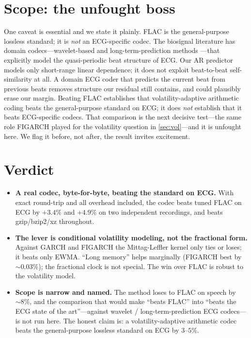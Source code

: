 \documentclass[11pt,reqno]{amsart}
\theoremstyle{plain}
\theoremstyle{remark}
\begin{document}
\section{Scope: the unfought boss}
\label{sec:scope}

One caveat is essential and we state it plainly. FLAC is the general-purpose
lossless standard; it is \emph{not} an ECG-specific codec. The biosignal
literature has domain codecs---wavelet-based and long-term-prediction methods
\cite{ecgcomp}---that explicitly model the quasi-periodic beat structure of ECG.
Our AR predictor models only short-range linear dependence; it does not exploit
beat-to-beat self-similarity at all. A domain ECG coder that predicts the
current beat from previous beats removes structure our residual still contains,
and could plausibly erase our margin. Beating FLAC establishes that
volatility-adaptive arithmetic coding beats the general-purpose standard on ECG;
it does \emph{not} establish that it beats ECG-specific codecs. That comparison
is the next decisive test---the same role FIGARCH played for the volatility
question in \cref{sec:vol}---and it is unfought here. We flag it before, not
after, the result invites excitement.

\section{Verdict}
\label{sec:verdict}

\begin{itemize}
\item \textbf{A real codec, byte-for-byte, beating the standard on ECG.} With
  exact round-trip and all overhead included, the codec beats tuned FLAC on ECG
  by $+3.4\%$ and $+4.9\%$ on two independent recordings, and beats gzip/bzip2/xz
  throughout.
\item \textbf{The lever is conditional volatility modeling, not the fractional
  form.} Against GARCH and FIGARCH the Mittag-Leffler kernel only ties or loses;
  it beats only EWMA. ``Long memory'' helps marginally (FIGARCH best by
  $\sim0.03\%$); the fractional clock is not special. The win over FLAC is robust
  to the volatility model.
\item \textbf{Scope is narrow and named.} The method loses to FLAC on speech by
  $\sim8\%$, and the comparison that would make ``beats FLAC'' into ``beats the
  ECG state of the art''---against wavelet / long-term-prediction ECG codecs---is
  not run here. The honest claim is: a volatility-adaptive arithmetic codec
  beats the general-purpose lossless standard on ECG by $3$--$5\%$.
\end{itemize}
\end{document}
